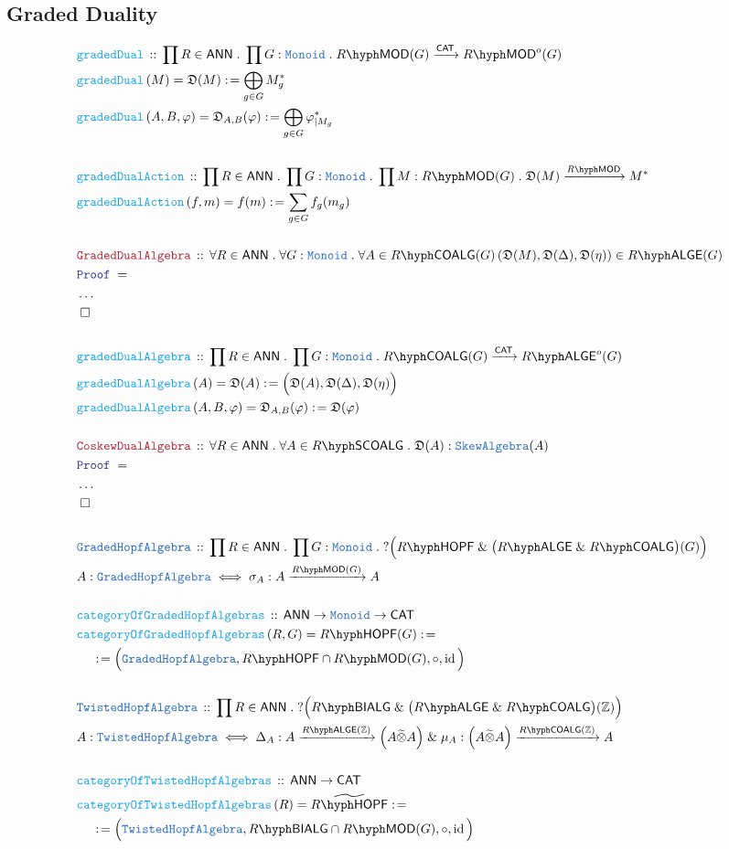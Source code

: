 \documentclass[12pt]{scrartcl}%
\newcommand{\TYPE}[1]{\textcolor{NavyBlue}{\mathtt{#1}}}%
\newcommand{\FUNC}[1]{\textcolor{Cerulean}{\mathtt{#1}}}%
\newcommand{\LOGIC}[1]{\textcolor{Blue}{\mathtt{#1}}}%
\newcommand{\THM}[1]{\textcolor{Maroon}{\mathtt{#1}}}%
\renewcommand{\.}{\; . \;} %
\newcommand{\de}{: \kern 0.1pc =} %
\newcommand{\Act}[1]{\left( #1 \right)} %
\newcommand{\Theorem}[2]{& \THM{#1} \, :: \, #2 \\ & \Proof = \\ } %
\newcommand{\DeclareType}[2]{& \TYPE{#1} \, :: \, #2 \\}%
\newcommand{\DefineType}[3]{& #1 : \TYPE{#2} \iff #3 \\}%
\newcommand{\DeclareFunc}[2]{& \FUNC{#1} \, :: \, #2 \\}%
\newcommand{\DefineNamedFunc}[4]{&  \FUNC{#1}\Act{#2} = #3 \de #4 \\}%
\newcommand{\NewLine}{\\ & \kern 1pc}%
\newcommand{\Page}[1]{ \begin{align*} #1 \end{align*}  }%
\newcommand{\NoProof}{ & \ldots \\ \EndProof}%
\renewcommand{\And}{\; \& \;}%
\newcommand{\Int}{\mathbb{Z}}%
\DeclareMathOperator*{\id}{id}%
\newcommand{\QED}{\; \square} %
\newcommand{\EndProof}{& \QED \\} %
\newcommand{\Proof}{\LOGIC{Proof} \; } %
\newcommand{\Arrow}[1]{\xrightarrow{#1}}%
\newcommand{\CAT}{\mathsf{CAT}} %
\newcommand{\LMOD}[1]{#1\hyph\mathsf{MOD}} %
\newcommand{\ANN}{\mathsf{ANN}} %
\newcommand{\LALGE}[1]{#1\hyph\mathsf{ALGE}}%
\newcommand{\COALG}[1]{#1\hyph\mathsf{COALG}}%
\newcommand{\SCOALG}[1]{#1\hyph\mathsf{SCOALG}}%
\newcommand{\BIALG}[1]{#1\hyph\mathsf{BIALG}}%
\newcommand{\HOPF}[1]{#1\hyph\mathsf{HOPF}}%
\begin{document}
\subsection{Graded Duality }
\Page{
	\DeclareFunc{gradedDual}{\prod R \in \ANN \. \prod G : \TYPE{Monoid} \. \LMOD{R}(G) \Arrow{\CAT} \LMOD{R}^{o}(G) }
	\DefineNamedFunc{gradedDual}{ M  }{\mathfrak{D}(M)}{\bigoplus_{g \in G} M_g^*}
	\DefineNamedFunc{gradedDual}{A,B,\varphi}{\mathfrak{D}_{A,B}(\varphi)}{\bigoplus_{g \in G} \varphi_{|M_g}^*}
	\\
	\DeclareFunc{gradedDualAction}{
		\prod R \in \ANN \. 
		\prod G : \TYPE{Monoid} \. 
		\prod M : \LMOD{R}(G)  \. 
		\mathfrak{D}(M) \Arrow{\LMOD{R}} M^*
	}
	\DefineNamedFunc{gradedDualAction}{f,m}{f(m)}{\sum_{g \in G} f_g(m_g)}
	\\
	\Theorem{GradedDualAlgebra}
	{
		\forall R \in \ANN \. 
		\forall G : \TYPE{Monoid} \. 
		\forall A \in \COALG{R}(G)
		\left(  \mathfrak{D}(M), \mathfrak{D}(\Delta), \mathfrak{D}(\eta )\right) \in \LALGE{R}(G) 
	}
	\NoProof
	\\
	\DeclareFunc{gradedDualAlgebra}{\prod R \in \ANN \. \prod G : \TYPE{Monoid} \. \COALG{R}(G) \Arrow{\CAT} \LALGE{R}^{o}(G) }
	\DefineNamedFunc{gradedDualAlgebra}{ A  }{\mathfrak{D}(A)}{\Big(\mathfrak{D}(A),\mathfrak{D}(\Delta),\mathfrak{D}(\eta) \Big)}
	\DefineNamedFunc{gradedDualAlgebra}{A,B,\varphi}{\mathfrak{D}_{A,B}(\varphi)}{\mathfrak{D}(\varphi)}
	\\
	\Theorem{CoskewDualAlgebra}{\forall R \in \ANN \. \forall A \in \SCOALG{R} \. \mathfrak{D}(A) : \TYPE{SkewAlgebra}(A)}
	\NoProof
	\\
	\DeclareType{GradedHopfAlgebra}{\prod R \in \ANN \. \prod G : \TYPE{Monoid} \. 
		?\Big( \HOPF{R} \And  \big(\LALGE{R} \And \COALG{R}\big)(G) \Big) }
	\DefineType{A}{GradedHopfAlgebra}{\sigma_A : A \Arrow{\LMOD{R}(G)} A}
	\\
	\DeclareFunc{categoryOfGradedHopfAlgebras}{ 
		\ANN \to \TYPE{Monoid} \to \CAT  
	}
	\DefineNamedFunc{categoryOfGradedHopfAlgebras}{ R,G }{\HOPF{R}(G)}
	{ \NewLine \de \Big( \TYPE{GradedHopfAlgebra}, \HOPF{R} \cap \LMOD{R}(G),\circ,\id\Big)  }
	\\
	\DeclareType{TwistedHopfAlgebra}{\prod R \in \ANN \.  
		?\Big( \BIALG{R} \And  \big(\LALGE{R} \And \COALG{R}\big)(\Int) \Big) }
	\DefineType{A}{TwistedHopfAlgebra}{
		\Delta_A : A \Arrow{\LALGE{R}(\Int)} \Big(A \widetilde{\otimes} A\Big)
		\And
		\mu_A  :  \Big(A \widetilde{\otimes} A\Big) \Arrow{\COALG{R}(\Int)} A
        }
	\\
	\DeclareFunc{categoryOfTwistedHopfAlgebras}{ 
		\ANN  \to \CAT  
	}
	\DefineNamedFunc{categoryOfTwistedHopfAlgebras}{ R }{\widetilde{\HOPF{R}}}
	{ \NewLine \de \Big( \TYPE{TwistedHopfAlgebra}, \BIALG{R} \cap \LMOD{R}(G),\circ,\id\Big)  }
	\\
}
\end{document}
